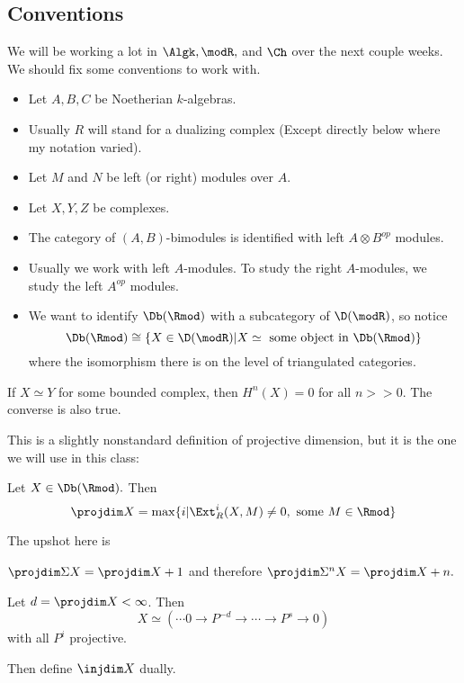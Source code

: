 \documentclass[12pt]{article}
\begin{document}
\subsection{Conventions}
We will be working a lot in $\Algk,\modR,$ and $\Ch$ over the next couple weeks. We should fix 
some conventions to work with.

\begin{itemize}
	\item Let $A,B,C$ be Noetherian $k$-algebras.
	\item Usually $R$ will stand for a dualizing complex (Except directly below where my notation varied).
	\item Let $M$ and $N$ be left (or right) modules over $A$.
	\item Let $X,Y,Z$ be complexes.
	\item The category of $(A,B)$-bimodules is identified with left $A\otimes B^{op}$ modules.
	\item Usually we work with left $A$-modules. To study the right $A$-modules, we study the left $A^{op}$ modules.
	\item We want to identify $\Db(\Rmod)$ with a subcategory of $\D(\modR)$, so notice
	\[\Db(\Rmod)\cong \{X\in \D(\modR)|X\simeq\text{ some object in } \Db(\Rmod)\}\]
	where the isomorphism there is on the level of triangulated categories.
\end{itemize}
\begin{prop}
	If $X\simeq Y$ for some bounded complex, then $H^n(X)=0$ for all $n>>0$. The converse is also true.
\end{prop}

This is a slightly nonstandard definition of projective dimension, but it is the one we will use in this class:
\begin{defn}
	Let $X\in\Db(\Rmod).$ Then 
	\[\projdim X=\max\{i|\Ext_R^i(X,M)\ne 0,\text{ some } M\in\Rmod\}\]
\end{defn}
The upshot here is
\begin{lem}
	$\projdim \Sigma X=\projdim X+1$ and therefore $\projdim\Sigma^n X=\projdim X+n.$
\end{lem}
\begin{lem}
	Let $d=\projdim X<\infty$. Then 
	\[X\simeq (\cdots 0\to P^{-d}\to\cdots\to P^s\to 0)\]
	with all $P^i$ projective.
\end{lem}

Then define $\injdim X$ dually. 
\end{document}
